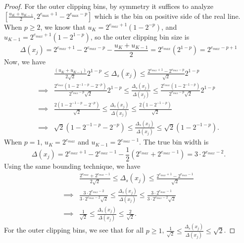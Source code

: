 \documentclass[10pt,a4paper]{amsart}
\newcommand{\paren}[1]{\left( #1 \right)}
\begin{document}
\begin{proof}
For the outer clipping bins, by symmetry it suffices to analyze $[\frac{u_K + u_{K-1}}{2}, 2^{e_{\max}+1}-2^{e_{\max}-p}]$ which is the bin on positive side of the real line. When $p \geq 2$, we know that $u_K = 2^{e_{max}+1}(1 - 2^{-p})$, and $u_{K-1} = 2^{e_{max}+1}(1 - 2^{1-p})$, so the outer clipping bin size is \begin{equation}
\Delta(x_j) = 2^{e_{max} + 1} - 2^{e_{max} - p}- \frac{u_K + u_{K-1}}{2} = 2^{e_{max}}\paren{2^{1-p}} = 2^{e_{max}-p + 1}
\end{equation}
Now, we have
\begin{equation}
\begin{aligned}
  &\frac{(u_K + u_{K-1})}{2\sqrt{2}}2^{1-p} \leq \Delta_s(x_j) \leq \frac{2^{e_{max} + 1} - 2^{e_{max} - p}}{\sqrt{2}}2^{1-p}\\
  \implies &\frac{ 2^{e_{max}}(1 - 2^{-1-p} - 2^{-p})}{2^{e_{max} - p}\sqrt{2}}2^{1-p} \leq \frac{\Delta_s(x_j)}{\Delta(x_j)} \leq \frac{2^{e_{max}}(1 - 2^{-1 - p})}{2^{e_{max} - p}\sqrt{2}}2^{1-p}\\
  \implies &\frac{ 2(1 - 2^{-1-p} - 2^{-p})}{\sqrt{2}} \leq \frac{\Delta_s(x_j)}{\Delta(x_j)} \leq \frac{2(1- 2^{-1-p})}{\sqrt{2}}\\
  \implies &\sqrt{2}(1 - 2^{-1-p} - 2^{-p}) \leq \frac{\Delta_s(x_j)}{\Delta(x_j)} \leq \sqrt{2}(1- 2^{-1-p}).
\end{aligned}
\end{equation}
When $p = 1$, $u_K = 2^{e_{max}}$ and $u_{K-1} = 2^{e_{max}-1}$. The true bin width is 
\begin{equation}
\Delta(x_j) = 2^{e_{max}+1} - 2^{e_{max}-1} - \frac{1}{2}(2^{e_{max}} + 2^{e_{max}-1}) = 3\cdot2^{e_{max}-2}.
\end{equation}
Using the same bounding technique, we have
\begin{equation}
\begin{aligned}
  &\frac{2^{e_{max}} + 2^{e_{max}-1}}{2\sqrt{2}} \leq \Delta_s(x_j) \leq \frac{2^{e_{max}+1} - 2^{e_{max}-1}}{\sqrt{2}}\\
  \implies &\frac{3\cdot 2^{e_{max}-2}}{3\cdot2^{e_{max}-2}\sqrt{2}} \leq \frac{\Delta_s(x_j)}{\Delta(x_j)} \leq \frac{3\cdot 2^{e_{max}-1}}{3\cdot2^{e_{max}-2}\sqrt{2}}\\
  \implies &\frac{ 1}{\sqrt{2}} \leq \frac{\Delta_s(x_j)}{\Delta(x_j)} \leq \frac{2}{\sqrt{2}}.
\end{aligned}
\end{equation}
For the outer clipping bins, we see that for all $p\geq 1$, $\frac{1}{\sqrt{2}} \leq \frac{\Delta_s(x_j)}{\Delta(x_j)} \leq \sqrt{2}$.


\end{proof}
\end{document}
